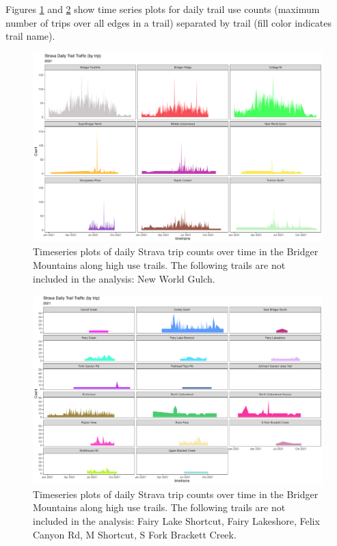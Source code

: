 \documentclass[
]{book}
\begin{document}
Figures \ref{fig:strava-bytrailname-high} and
\ref{fig:strava-bytrailname-low} show time series plots for daily trail
use counts (maximum number of trips over all edges in a trail) separated
by trail (fill color indicates trail name).

\begin{figure}

{\centering \includegraphics[width=1\linewidth]{../figures/Strava_day_TS_bytrip_high} 

}

\caption{Timeseries plots of daily Strava trip counts over time in the Bridger Mountains along high use trails. The following trails are not included in the analysis: New World Gulch.}\label{fig:strava-bytrailname-high}
\end{figure}

\begin{figure}

{\centering \includegraphics[width=1\linewidth]{../figures/Strava_day_TS_bytrip_low} 

}

\caption{Timeseries plots of daily Strava trip counts over time in the Bridger Mountains along high use trails. The following trails are not included in the analysis: Fairy Lake Shortcut, Fairy Lakeshore, Felix Canyon Rd, M Shortcut, S Fork Brackett Creek.}\label{fig:strava-bytrailname-low}
\end{figure}
\end{document}

